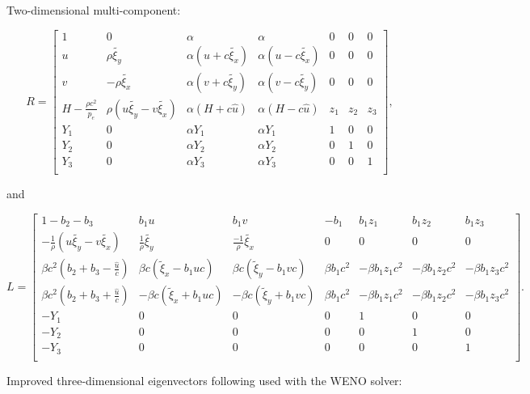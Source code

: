 Two-\/dimensional multi-\/component\+:

\[ \begin{equation*} R= \begin{bmatrix} 1 & 0 & \alpha & \alpha & 0 & 0& 0\\ u & \rho \tilde{\xi_y} & \alpha \left(u+c \tilde{\xi_x}\right) &\alpha \left(u-c \tilde{\xi_x}\right)& 0 & 0& 0 \\ v & -\rho \tilde{\xi_x} & \alpha \left(v+c \tilde{\xi_y}\right) & \alpha \left(v-c \tilde{\xi_y}\right) & 0 & 0& 0 \\ H-\frac{\rho c^2}{p_e} & \rho \left( u \tilde{\xi_y} -v \tilde{\xi_x}\right) & \alpha \left(H+c \hat{u}\right) &\alpha \left(H-c \hat{u}\right) & z_1 & z_2 & z_3\\ Y_1 & 0 & \alpha Y_1 & \alpha Y_1 & 1 & 0 & 0 \\ Y_2 & 0 & \alpha Y_2 & \alpha Y_2 &0 & 1 & 0 \\ Y_3 & 0 & \alpha Y_3 & \alpha Y_3 &0 & 0 & 1 \\ \end{bmatrix}, \end{equation*} \]

and

\[ \begin{equation*} L= \begin{bmatrix} 1-b_2-b_3 & b_1 u & b_1 v & -b_1 & b_1z_1 & b_1 z_2 & b_1 z_3\\ -\frac{1}{\rho}(u \tilde{\xi_y}-v\tilde{\xi_x}) & \frac{1}{\rho}\tilde{\xi_y} & \frac{-1}{\rho}\tilde{\xi_x} & 0 & 0 & 0 &0\\ \beta c^2(b_2+b_3-\frac{\hat{u}}{c}) & \beta c (\tilde \xi_x - b_1 u c) & \beta c (\tilde\xi_y -b_1 vc) & \beta b_1 c^2 & -\beta b_1z_1 c^2 & -\beta b_1z_2 c^2 & -\beta b_1 z_3 c^2\\ \beta c^2(b_2+b_3+\frac{\hat{u}}{c}) & -\beta c (\tilde\xi_x + b_1 u c) & -\beta c (\tilde \xi_y +b_1 vc) & \beta b_1 c^2 & -\beta b_1z_1 c^2 & -\beta b_1z_2 c^2 & -\beta b_1 z_3 c^2\\ -Y_1 & 0 & 0 & 0 & 1 & 0 & 0\\ -Y_2 & 0 & 0 & 0 & 0 & 1 & 0\\ -Y_3 & 0 & 0 & 0 & 0 & 0 & 1\\ \end{bmatrix}. \end{equation*} \]

Improved three-\/dimensional eigenvectors following \cite{nonomura2017characteristic} used with the W\+E\+NO solver\+:

